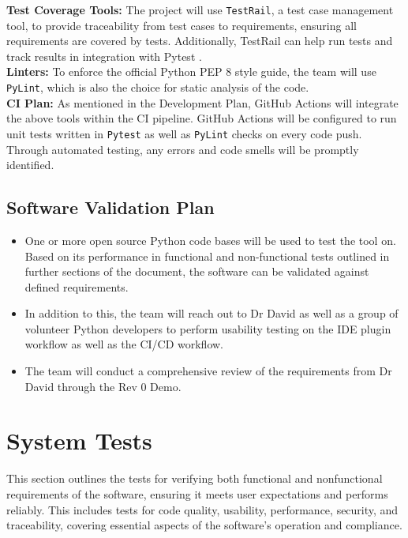 \documentclass[12pt, titlepage]{article}
\begin{document}
\noindent\textbf{Test Coverage Tools:} The project will use \texttt{TestRail}, a test case management tool, to provide traceability from test cases to requirements, ensuring all requirements are covered by tests. Additionally, TestRail can help run tests and track results in integration with Pytest \citep{testrail}.\\


\noindent\textbf{Linters:} To enforce the official Python PEP 8 style guide, the team will use \texttt{PyLint}, which is also the choice for static analysis of the code.\\

\noindent\textbf{CI Plan:} As mentioned in the Development Plan, GitHub Actions will integrate the above tools within the CI pipeline. GitHub Actions will be configured to run unit tests written in \texttt{Pytest} as well as \texttt{PyLint} checks on every code push. Through automated testing, any errors and code smells will be promptly identified.\\

\subsection{Software Validation Plan}

\begin{itemize}
    \item One or more open source Python code bases will be used to test the tool on. Based on its performance in functional and non-functional tests outlined in further sections of the document, the software can be validated against defined requirements.
    \item In addition to this, the team will reach out to Dr David as well as a group of volunteer Python developers to perform usability testing on the IDE plugin workflow as well as the CI/CD workflow.
    \item The team will conduct a comprehensive review of the requirements from Dr David through the Rev 0 Demo.
\end{itemize}

\section{System Tests}

This section outlines the tests for verifying both functional and nonfunctional requirements of the software, ensuring it meets user expectations and performs reliably. This includes tests for code quality, usability, performance, security, and traceability, covering essential aspects of the software’s operation and compliance.
\end{document}
